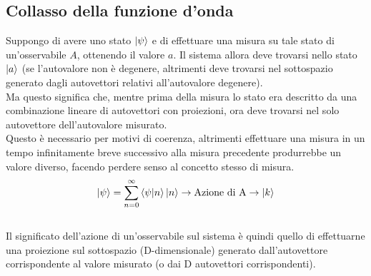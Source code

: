 \documentclass[twoside]{article}
\begin{document}
\subsection{Collasso della funzione d'onda}
Suppongo di avere uno stato $\ket{\psi}$ e di effettuare una misura su tale stato di un'osservabile $A$, ottenendo il valore $a$. Il sistema allora deve trovarsi nello stato $\ket{a}$ (se l'autovalore non è degenere, altrimenti deve trovarsi nel sottospazio generato dagli autovettori relativi all'autovalore degenere).
\\
Ma questo significa che, mentre prima della misura lo stato era descritto da una combinazione lineare di autovettori con proiezioni, ora deve trovarsi nel solo autovettore dell'autovalore misurato. 
\\ 
Questo è necessario per motivi di coerenza, altrimenti effettuare una misura in un tempo infinitamente breve successivo alla misura precedente produrrebbe un valore diverso, facendo perdere senso al concetto stesso di misura.
\\
\begin{equation}
    \ket{\psi}=\displaystyle\sum_{n=0}^{\infty} \bra{\psi}\ket{n}\ket{n} \rightarrow \text{Azione di A} \rightarrow \ket{k}
\end{equation}
\\
Il significato dell'azione di un'osservabile sul sistema è quindi quello di effettuarne una proiezione sul sottospazio (D-dimensionale) generato dall'autovettore corrispondente al valore misurato (o dai D autovettori corrispondenti).
\end{document}
